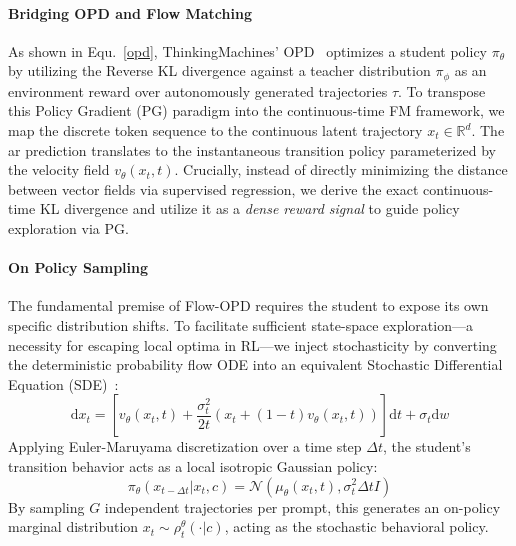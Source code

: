 \paragraph{Bridging OPD and Flow Matching}
As shown in Equ.~\ref{opd}, ThinkingMachines' OPD~\cite{lu2025onpolicydistillation} optimizes a student policy $\pi_\theta$ by utilizing the Reverse KL divergence against a teacher distribution $\pi_{\phi}$ as an environment reward over autonomously generated trajectories $\tau$.
To transpose this Policy Gradient (PG) paradigm into the continuous-time FM framework, we map the discrete token sequence to the continuous latent trajectory $x_t \in \mathbb{R}^d$. The ar prediction translates to the instantaneous transition policy parameterized by the velocity field $v_\theta(x_t, t)$. Crucially, instead of directly minimizing the distance between vector fields via supervised regression, we derive the exact continuous-time KL divergence and utilize it as a \textit{dense reward signal} to guide policy exploration via PG.

\paragraph{On Policy Sampling}
The fundamental premise of Flow-OPD requires the student to expose its own specific distribution shifts. To facilitate sufficient state-space exploration—a necessity for escaping local optima in RL—we inject stochasticity by converting the deterministic probability flow ODE into an equivalent Stochastic Differential Equation (SDE)~\cite{liu2025flow}:
\begin{equation}
\text{d}x_t = \left[ v_{\theta}(x_t, t) + \frac{\sigma_t^2}{2t}(x_t + (1-t)v_{\theta}(x_t, t)) \right] \text{d}t + \sigma_t \text{d}w
\end{equation}
Applying Euler-Maruyama discretization over a time step $\Delta t$, the student's transition behavior acts as a local isotropic Gaussian policy:
\begin{equation}
\pi_\theta(x_{t-\Delta t} | x_t, c) = \mathcal{N}(\mu_\theta(x_t, t), \sigma_t^2 \Delta t I)
\end{equation}
By sampling $G$ independent trajectories per prompt, this generates an on-policy marginal distribution $x_t \sim \rho_t^\theta(\cdot | c)$, acting as the stochastic behavioral policy.

